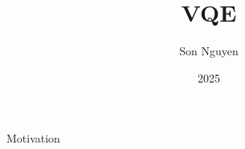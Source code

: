 \documentclass{beamer}
\title{VQE}
\author{Son Nguyen}
\institute{Stevens Institute of Technology}
\date{2025}
\begin{document}
\frame{\titlepage}

\begin{frame}{Motivation}

\end{frame}
\end{document}
